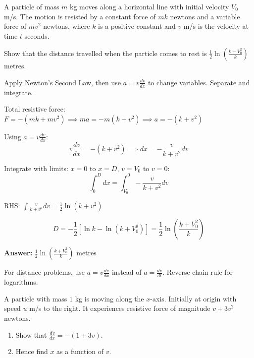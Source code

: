 
\begin{problem}
A particle of mass $m$ kg moves along a horizontal line with initial velocity $V_0$ m/s. The motion is resisted by a constant force of $mk$ newtons and a variable force of $mv^2$ newtons, where $k$ is a positive constant and $v$ m/s is the velocity at time $t$ seconds.

Show that the distance travelled when the particle comes to rest is $\displaystyle \frac{1}{2}\ln\left(\frac{k + V_0^2}{k}\right)$ metres.
\end{problem}

\begin{hint}
Apply Newton's Second Law, then use $a = v\frac{dv}{dx}$ to change variables. Separate and integrate.
\end{hint}

\begin{solution}
Total resistive force: $F = -(mk + mv^2) \implies ma = -m(k + v^2) \implies a = -(k + v^2)$

Using $a = v\frac{dv}{dx}$:
\[
v \frac{dv}{dx} = -(k + v^2) \implies dx = -\frac{v}{k + v^2} dv
\]

Integrate with limits: $x=0$ to $x=D$, $v=V_0$ to $v=0$:
\[
\int_{0}^{D} dx = \int_{V_0}^{0} -\frac{v}{k + v^2} dv
\]

RHS: $\int \frac{v}{k+v^2} dv = \frac{1}{2} \ln(k+v^2)$

\[
D = -\frac{1}{2}[\ln k - \ln(k + V_0^2)] = \frac{1}{2}\ln\left(\frac{k + V_0^2}{k}\right)
\]

\textbf{Answer:} $\boxed{\frac{1}{2}\ln\left(\frac{k + V_0^2}{k}\right) \text{ metres}}$
\end{solution}

\begin{takeaways}
For distance problems, use $a = v\frac{dv}{dx}$ instead of $a = \frac{dv}{dt}$. Reverse chain rule for logarithms.
\end{takeaways}

\vspace{1cm}

\begin{problem}
A particle with mass $1$ kg is moving along the $x$-axis. Initially at origin with speed $u$ m/s to the right. It experiences resistive force of magnitude $v + 3v^2$ newtons.

\begin{enumerate}[label=(\roman*)]
\item Show that $\displaystyle \frac{dv}{dx} = -(1 + 3v)$.
\item Hence find $x$ as a function of $v$.
\end{enumerate}
\end{problem}

